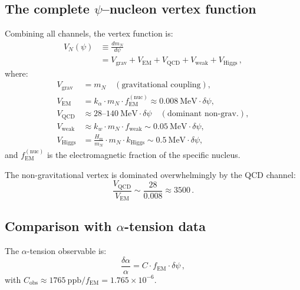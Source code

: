 \documentclass[aps,prd,twocolumn,superscriptaddress,floatfix,nofootinbib]{revtex4-2}
\newcommand{\fEM}{f_{\mathrm{EM}}}
\newcommand{\mN}{m_N}
\newcommand{\ka}{k_\alpha}
\newcommand{\dpsi}{\delta\psi}
\newcommand{\dalpha}{\delta\alpha}
\newcommand{\alphafine}{\alpha}
\begin{document}
\subsection{The complete $\psi$--nucleon vertex function}
\label{sec:complete_vertex}

Combining all channels, the vertex function is:
\begin{align}
V_N(\psi) &\equiv \frac{d\mN}{d\psi} \nonumber \\
&= V_{\mathrm{grav}} + V_{\mathrm{EM}} + V_{\mathrm{QCD}}
+ V_{\mathrm{weak}} + V_{\mathrm{Higgs}} \, ,
\label{eq:V_total}
\end{align}
where:
\begin{align}
V_{\mathrm{grav}} &= \mN \quad (\text{gravitational coupling}), \\
V_{\mathrm{EM}} &= \ka \cdot \mN \cdot f_{\mathrm{EM}}^{(\mathrm{nuc})}
  \approx 0.008~\text{MeV} \cdot \dpsi , \\
V_{\mathrm{QCD}} &\approx 28\text{--}140~\text{MeV} \cdot \dpsi
  \quad (\text{dominant non-grav.}) , \\
V_{\mathrm{weak}} &\approx k_w \cdot \mN \cdot f_{\mathrm{weak}}
  \sim 0.05~\text{MeV} \cdot \dpsi , \\
V_{\mathrm{Higgs}} &= \frac{H_m}{\mN} \cdot \mN \cdot k_{\mathrm{Higgs}}
  \sim 0.5~\text{MeV} \cdot \dpsi ,
\end{align}
and $f_{\mathrm{EM}}^{(\mathrm{nuc})}$ is the electromagnetic fraction of
the specific nucleus.

The non-gravitational vertex is dominated overwhelmingly by the QCD channel:
\begin{equation}
\frac{V_{\mathrm{QCD}}}{V_{\mathrm{EM}}} \sim
\frac{28}{0.008} \approx 3500 \, .
\label{eq:QCD_EM_ratio}
\end{equation}

\subsection{Comparison with $\alpha$-tension data}
\label{sec:alpha_comparison}

The $\alpha$-tension observable is:
\begin{equation}
\frac{\dalpha}{\alphafine} = C \cdot \fEM \cdot \dpsi \, ,
\end{equation}
with $C_{\mathrm{obs}} \approx 1765~\text{ppb}/\fEM = 1.765 \times 10^{-6}$.
\end{document}
